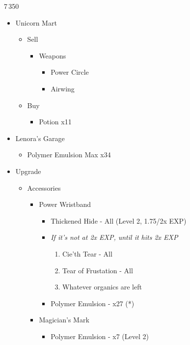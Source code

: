 \begin{shop}{7\,350}
\begin{itemize}
    \item Unicorn Mart
    \begin{itemize}
        \item Sell
        \begin{itemize}
            \item Weapons
            \begin{itemize}
                \item Power Circle
                \item Airwing
            \end{itemize}
        \end{itemize}
        \item Buy
		\begin{itemize}
			\item Potion x11
		\end{itemize}
    \end{itemize}
    \item Lenora's Garage
	\begin{itemize}
		\item Polymer Emulsion Max x34
	\end{itemize}
\end{itemize}
\end{shop}
\begin{upgrade}
\begin{itemize}
    \item Upgrade
    \begin{itemize}
        \item Accessories
        \begin{itemize}
            \item Power Wristband
            \begin{itemize}
                \item Thickened Hide - All (Level 2, 1.75/2x EXP)
                \item \textit{If it's not at 2x EXP, until it hits 2x EXP}
                \begin{enumerate}
                    \item Cie'th Tear - All
                    \item Tear of Frustation - All
                    \item Whatever organics are left
                \end{enumerate}
                \item Polymer Emulsion - x27 (*)
            \end{itemize}
			\item Magician's Mark
			\begin{itemize}
				\item Polymer Emulsion - x7 (Level 2)
			\end{itemize}
        \end{itemize}
    \end{itemize}
\end{itemize}
\end{upgrade}

